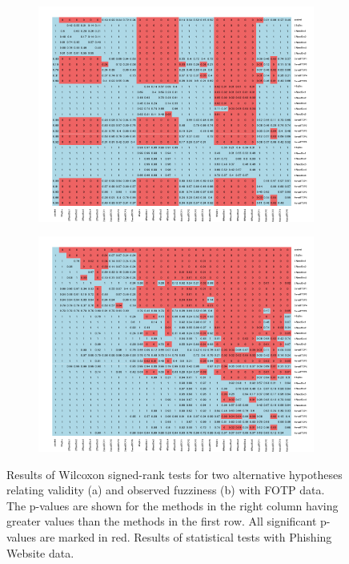 \documentclass[main]{subfiles}
\begin{document}
\begin{figure}[h]
\centering
\begin{subfigure}{.5\textwidth}
  \centering
  \includegraphics[width=\linewidth]{images/heatmapFOTP}
\end{subfigure}%
\begin{subfigure}{.5\textwidth}
  \centering
  \includegraphics[width=\linewidth]{images/heatmapFOTP_eff}
\end{subfigure}%
\caption{Results of Wilcoxon signed-rank tests for two alternative hypotheses relating validity (a) and observed fuzziness (b) with FOTP data. The p-values are shown for the methods in the right column having greater values than the methods in the first row. All significant p-values are marked in red. Results of statistical tests with Phishing Website data.} \label{fig:testFotp}
\end{figure}
\end{document}
